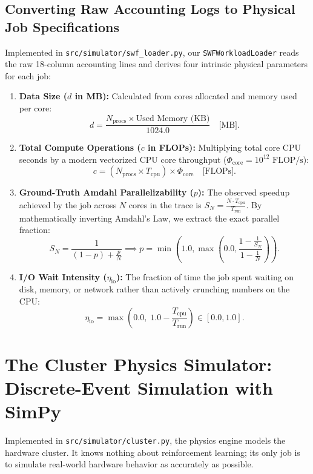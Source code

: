 \documentclass[11pt,a4paper]{article}
\begin{document}
\subsection{Converting Raw Accounting Logs to Physical Job Specifications}
Implemented in \texttt{src/simulator/swf\_loader.py}, our \texttt{SWFWorkloadLoader} reads the raw 18-column accounting lines and derives four intrinsic physical parameters for each job:
\begin{enumerate}[noitemsep, topsep=2pt]
    \item \textbf{Data Size ($d$ in MB):} Calculated from cores allocated and memory used per core:
    \begin{equation}
        d = \frac{N_{\text{procs}} \times \text{Used Memory (KB)}}{1024.0} \quad \text{[MB]}.
    \end{equation}
    \item \textbf{Total Compute Operations ($c$ in FLOPs):} Multiplying total core CPU seconds by a modern vectorized CPU core throughput ($\Phi_{\text{core}} = 10^{12}\text{ FLOP/s}$):
    \begin{equation}
        c = (N_{\text{procs}} \times T_{\text{cpu}}) \times \Phi_{\text{core}} \quad \text{[FLOPs]}.
    \end{equation}
    \item \textbf{Ground-Truth Amdahl Parallelizability ($p$):} The observed speedup achieved by the job across $N$ cores in the trace is $S_N = \frac{N \cdot T_{\text{cpu}}}{T_{\text{run}}}$. By mathematically inverting Amdahl's Law, we extract the exact parallel fraction:
    \begin{equation}
        S_N = \frac{1}{(1-p) + \frac{p}{N}} \implies p = \min\left(1.0, \max\left(0.0, \frac{1 - \frac{1}{S_N}}{1 - \frac{1}{N}}\right)\right).
    \end{equation}
    \item \textbf{I/O Wait Intensity ($\eta_{\text{io}}$):} The fraction of time the job spent waiting on disk, memory, or network rather than actively crunching numbers on the CPU:
    \begin{equation}
        \eta_{\text{io}} = \max\left(0.0, \; 1.0 - \frac{T_{\text{cpu}}}{T_{\text{run}}}\right) \in [0.0, 1.0].
    \end{equation}
\end{enumerate}

\section{The Cluster Physics Simulator: Discrete-Event Simulation with SimPy}
Implemented in \texttt{src/simulator/cluster.py}, the physics engine models the hardware cluster. It knows nothing about reinforcement learning; its only job is to simulate real-world hardware behavior as accurately as possible.
\end{document}
